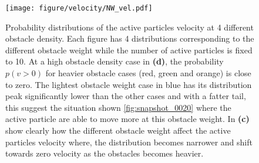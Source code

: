 \begin{figure}[htbp]
    \centering
    \texttt{[image: figure/velocity/NW\_vel.pdf]}
    \caption{Probability distributions of the active particles velocity at 
    4 different obstacle density. Each figure has 4 distributions 
    corresponding to the different obstacle weight while the number 
    of active particles is fixed to 10. At a high obstacle density 
    case in \textbf{(d)}, the probability $p(v>0)$ for heavier obstacle 
    cases (red, green and orange) is close to zero. The lightest obstacle 
    weight case in blue has its distribution peak significantly lower than 
    the other cases and with a fatter tail, this suggest the situation 
    shown \cref{fig:snapshot_0020} where the active particle are able to 
    move more at this obstacle weight. In \textbf{(c)} show clearly how 
    the different obstacle weight affect the active particles velocity where, 
    the distribution becomes narrower and shift towards zero velocity as the 
    obstacles becomes heavier.} 
    \label{fig:velkde_NWNC10B}
\end{figure}


